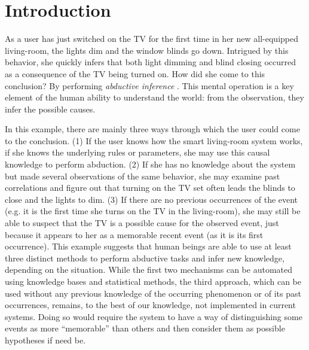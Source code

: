\documentclass[entropy,article,submit,moreauthors,pdftex]{Definitions/mdpi}
\begin{document}

\section{Introduction}
\label{sec:introduction}

As a user has just switched on the TV for the first time in her new  all-equipped living-room, the
lights dim and the window blinds go down. Intrigued by this behavior, she
quickly infers that both light dimming and blind closing occurred as a
consequence of the TV being turned on. How did she come to this conclusion?
By performing \emph{abductive inference} \cite{magnani_abduction_2011}. This mental operation
is a key element of the human ability to understand the world: from the
observation, they infer the possible causes.

In this example, there are mainly three ways through which the user could come to the
conclusion. (1) If the user knows how the smart living-room system works, if she
knows the underlying rules or parameters, she may use this causal
knowledge to perform abduction. (2) If she has no knowledge
about the system but made several observations of the same behavior, she may examine past
correlations and figure out that turning on the TV set often leads the blinds to
close and the lights to dim. (3) If there are no previous occurrences of the event (e.g. it is the first time she turns on the TV
in the living-room), she may still be able to
suspect that the TV is a possible cause for the observed event, just because it appears to her as a memorable recent event (as it is its first occurrence). This example
suggests that human beings are able to use at least three distinct methods to perform abductive tasks
and infer new knowledge, depending on the situation. While the first two mechanisms can be
automated using knowledge bases and statistical methods, the third approach, which can be used without any previous knowledge of the occurring phenomenon or of its past occurrences, remains, to the best of our knowledge, not implemented in current systems. Doing so would require the system to have a way of distinguishing some events as more ``memorable'' than others and then consider them as possible hypotheses if need be\cite{magnani_abduction_2011}.
\end{document}
